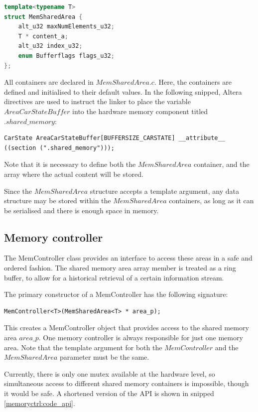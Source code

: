 \begin{lstlisting}[language=C++, label=sharedmem:code_memsharedarea, caption={$MemSharedArea$ structure, the container for shared data. Code found at: $software/ shared\_files/ MemSharedArea.h$}] 
template<typename T>
struct MemSharedArea {
	alt_u32 maxNumElements_u32;
	T * content_a;
	alt_u32 index_u32;
	enum Bufferflags flags_u32;
};
\end{lstlisting}

All containers are declared in $MemSharedArea.c$. Here, the containers are defined and initialised to their default values. In the following snipped, Altera directives are used to instruct the linker to place the variable $AreaCarStateBuffer$ into the hardware memory component titled $.shared\_memory$:
\begin{lstlisting}
CarState AreaCarStateBuffer[BUFFERSIZE_CARSTATE] __attribute__ ((section (".shared_memory")));
\end{lstlisting}
 Note that it is necessary to define both the $MemSharedArea$ container, and the array where the actual content will be stored.

Since the $MemSharedArea$ structure accepts a template argument, any data structure may be stored within the $MemSharedArea$ containers, as long as it can be serialised and there is enough space in memory.


\subsection{Memory controller}
The MemController class provides an interface to access these areas in a safe and ordered fashion. The shared memory area array member is treated as a ring buffer, to allow for a historical retrieval of a certain information stream. 

The primary constructor of a MemController has the following signature:
\begin{lstlisting}
MemController<T>(MemSharedArea<T> * area_p);
\end{lstlisting} 
This creates a MemController object that provides access to the shared memory area $area\_p$. One memory controller is always responsible for just one memory area. Note that the template argument for both the $MemController$ and the $MemSharedArea$ parameter must be the same. 

Currently, there is only one mutex available at the hardware level, so simultaneous access to different shared memory containers is impossible, though it would be safe. A shortened version of the API is shown in snipped \ref{memoryctrl:code_api}.

